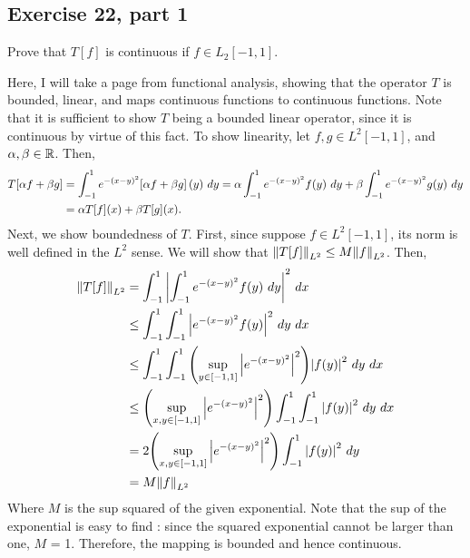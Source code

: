 \subsection{Exercise 22, part 1}
Prove that $T[f]$ is continuous if $f \in L_2[-1, 1]$. 
\vspace{-6mm}\partbreak
\begin{solution}

    Here, I will take a page from functional analysis, showing that the operator $T$ is bounded, linear, and maps continuous functions to continuous functions. Note that it is sufficient to show $T$ being a bounded linear operator, since it is continuous by virtue of this fact. To show linearity, let $f, g \in L^2[-1, 1]$, and $\alpha, \beta \in \mathbb{R}$. Then, 
    \begin{align*}
        T[\alpha f+\beta g] &= \int_{-1}^1 e^{-(x - y)^2}\qty[\alpha f + \beta g](y) \ dy = \alpha\int_{-1}^1 e^{-(x - y)^2}f(y) \ dy + \beta\int_{-1}^1 e^{-(x - y)^2} g(y) \ dy\\
        &= \alpha T[f](x) + \beta T[g](x).
    \end{align*}
    Next, we show boundedness of $T$. First, since suppose $f \in L^2[-1, 1]$, its norm is well defined in the $L^2$ sense. We will show that $\norm{T[f]}_{L^2} \leq M\norm{f}_{L^2}$. Then, 
    \begin{align*}
        \norm{T[f]}_{L^2} &= \int_{-1}^1 \qty|\int_{-1}^1 e^{-(x - y)^2}f(y) \ dy |^2 \ dx\\ 
        &\leq \int_{-1}^1 \int_{-1}^1 \qty|e^{-(x - y)^2}f(y)|^2 \ dy \ dx \\
        & \leq \int_{-1}^1 \int_{-1}^1 \qty(\sup_{y \in [-1, 1]} \qty|e^{-(x - y)^2}|^2)\qty|f(y)|^2 \ dy \ dx\\
        & \leq \qty(\sup_{x, y \in [-1, 1]}\qty|e^{-(x - y)^2}|^2)\int_{-1}^1 \int_{-1}^1 \qty|f(y)|^2 \ dy \ dx\\
        &= 2\qty(\sup_{x, y \in [-1, 1]}\qty|e^{-(x - y)^2}|^2) \int_{-1}^1 \qty|f(y)|^2 \ dy\\
        &= M\norm{f}_{L^2}
    \end{align*}
    Where $M$ is the sup squared of the given exponential. Note that the sup of the exponential is easy to find : since the squared exponential cannot be larger than one, $M$ = 1. Therefore, the mapping is bounded and hence continuous. 
\end{solution}

\newpage
